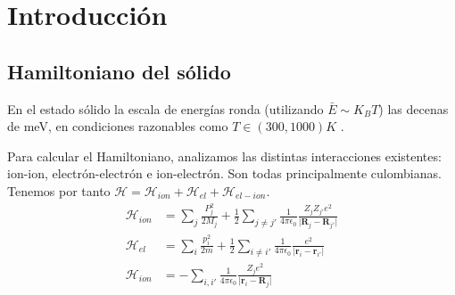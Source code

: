\part{Introducción}

\chapter{Hamiltoniano del sólido}
\label{sec:ham}
En el estado sólido la escala de energías ronda (utilizando
$\bar E \sim K_B T$) las decenas de meV, en condiciones
razonables como $T \in (300,1000)K$ .

Para calcular el Hamiltoniano, analizamos las distintas interacciones
existentes: ion-ion, electrón-electrón e ion-electrón. Son todas
principalmente culombianas. Tenemos por tanto
$\mathcal{H} =
\mathcal{H}_{ion}+\mathcal{H}_{el}+\mathcal{H}_{el-ion}$.
\begin{align}
  \mathcal{H}_{ion} &= \sum_j \frac{P_j^2}{2M_j}+ \frac{1}{2} \sum_{j \neq j'} \frac{1}{4\pi\epsilon_0}\frac{Z_j Z_{j'}e^2}{\vert \mathbf{R}_j - \mathbf{R}_{j'} \vert} \\
  \mathcal{H}_{el} &= \sum_i \frac{p_i^2}{2m}+ \frac{1}{2} \sum_{i \neq i'} \frac{1}{4\pi\epsilon_0}\frac{e^2}{\vert \mathbf{r}_i - \mathbf{r}_{i'} \vert} \\
  \mathcal{H}_{ion} &= - \sum_{i,i'} \frac{1}{4\pi\epsilon_0}\frac{Z_je^2}{\vert \mathbf{r}_i - \mathbf{R}_{j} \vert}
\end{align}

